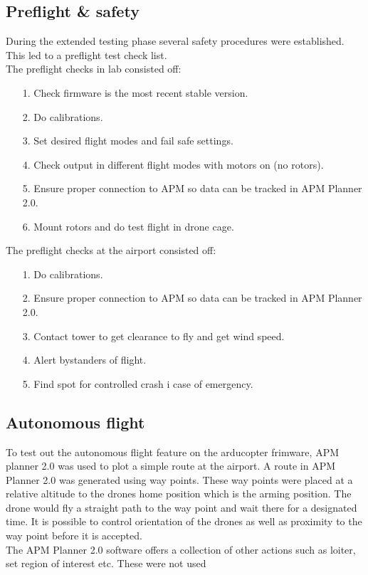 \subsection{Preflight \& safety}
During the extended testing phase several safety procedures were established. This led to a preflight test check list.\\
The preflight checks in lab consisted off:
\begin{itemize}
\item[1.] Check firmware is the most recent stable version.
\item[2.] Do calibrations.
\item[3.] Set desired flight modes and fail safe settings.
\item[4.] Check output in different flight modes with motors on (no rotors).
\item[5.] Ensure proper connection to APM so data can be tracked in APM Planner 2.0.
\item[6.] Mount rotors and do test flight in drone cage.
\end{itemize}

The preflight checks at the airport consisted off:
\begin{itemize}
\item[1.] Do calibrations.
\item[2.] Ensure proper connection to APM so data can be tracked in APM Planner 2.0.
\item[3.] Contact tower to get clearance to fly and get wind speed.
\item[4.] Alert bystanders of flight.
\item[5.] Find spot for controlled crash i case of emergency.
\end{itemize}

\subsection{Autonomous flight}
To test out the autonomous flight feature on the arducopter frimware, APM planner 2.0 was used to plot a simple route at the airport. A route in APM Planner 2.0 was generated using way points. These way points were placed at a relative altitude to the drones home position which is the arming position. The drone would fly a straight path to the way point and wait there for a designated time. It is possible to control orientation of the drones as well as proximity to the way point before it is accepted.\\
The APM Planner 2.0 software offers a collection of other actions such as loiter, set region of interest etc. These were not used\\

